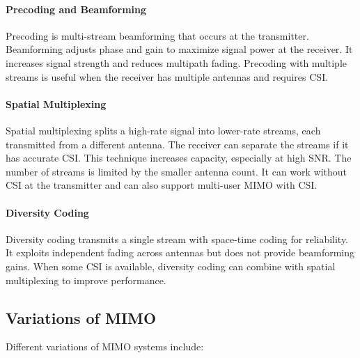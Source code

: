 \paragraph{Precoding and Beamforming}
Precoding is multi-stream beamforming that occurs at the transmitter. 
Beamforming adjusts phase and gain to maximize signal power at the receiver. 
It increases signal strength and reduces multipath fading. 
Precoding with multiple streams is useful when the receiver has multiple antennas and requires CSI.

\paragraph{Spatial Multiplexing}
Spatial multiplexing splits a high-rate signal into lower-rate streams, each transmitted from a different antenna. 
The receiver can separate the streams if it has accurate CSI. 
This technique increases capacity, especially at high SNR. 
The number of streams is limited by the smaller antenna count. 
It can work without CSI at the transmitter and can also support multi-user MIMO with CSI.

\paragraph{Diversity Coding}
Diversity coding transmits a single stream with space-time coding for reliability. 
It exploits independent fading across antennas but does not provide beamforming gains. 
When some CSI is available, diversity coding can combine with spatial multiplexing to improve performance.


\subsection{Variations of MIMO}

Different variations of MIMO systems include:

